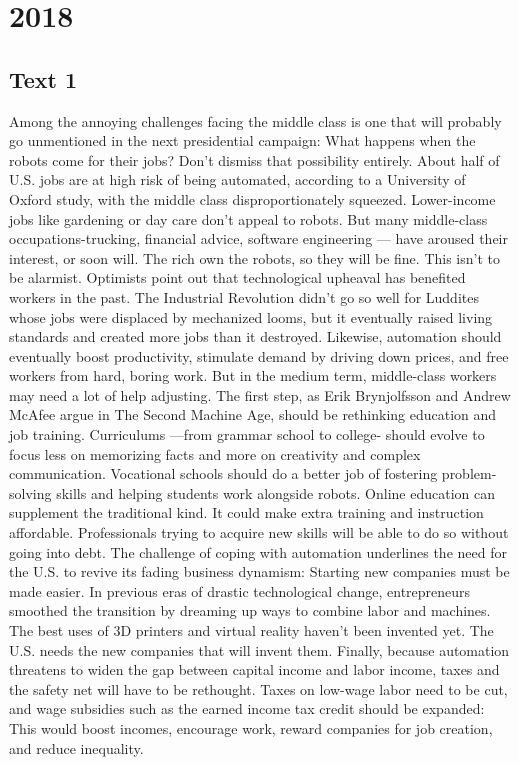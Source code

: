 
\section{2018}
\subsection{Text 1}
Among the annoying challenges facing the middle class is one that will probably go unmentioned in the next presidential campaign: What happens when the robots come for their jobs?
Don't dismiss that possibility entirely. About half of U.S. jobs are at high risk of being automated, according to a University of Oxford study, with the middle class disproportionately squeezed. Lower-income jobs like gardening or day care don't appeal to robots. But many middle-class occupations-trucking, financial advice, software engineering — have aroused their interest, or soon will. The rich own the robots, so they will be fine.
This isn't to be alarmist. Optimists point out that technological upheaval has benefited workers in the past. The Industrial Revolution didn't go so well for Luddites whose jobs were displaced by mechanized looms, but it eventually raised living standards and created more jobs than it destroyed. Likewise, automation should eventually boost productivity, stimulate demand by driving down prices, and free workers from hard, boring work. But in the medium term, middle-class workers may need a lot of help adjusting.
The first step, as Erik Brynjolfsson and Andrew McAfee argue in The Second Machine Age, should be rethinking education and job training. Curriculums —from grammar school to college- should evolve to focus less on memorizing facts and more on creativity and complex communication. Vocational schools should do a better job of fostering problem-solving skills and helping students work alongside robots. Online education can supplement the traditional kind. It could make extra training and instruction affordable. Professionals trying to acquire new skills will be able to do so without going into debt.
The challenge of coping with automation underlines the need for the U.S. to revive its fading business dynamism: Starting new companies must be made easier. In previous eras of drastic technological change, entrepreneurs smoothed the transition by dreaming up ways to combine labor and machines. The best uses of 3D printers and virtual reality haven't been invented yet. The U.S. needs the new companies that will invent them.
Finally, because automation threatens to widen the gap between capital income and labor income, taxes and the safety net will have to be rethought. Taxes on low-wage labor need to be cut, and wage subsidies such as the earned income tax credit should be expanded: This would boost incomes, encourage work, reward companies for job creation, and reduce inequality.
